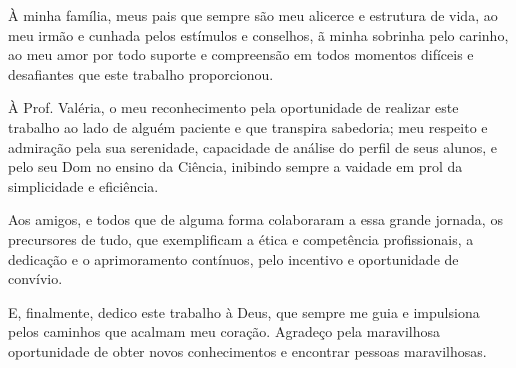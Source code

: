 À minha família, meus pais que sempre são meu alicerce e estrutura de vida, ao meu irmão e cunhada pelos estímulos e conselhos, ã minha sobrinha pelo carinho, ao meu amor por todo suporte e compreensão em todos momentos difíceis e desafiantes que este trabalho proporcionou.

À Prof. Valéria, o meu reconhecimento pela oportunidade de realizar este trabalho ao lado de alguém paciente e que transpira sabedoria; meu respeito e admiração pela sua serenidade, capacidade de análise do perfil de seus alunos, e pelo seu Dom no ensino da Ciência, inibindo sempre a vaidade em prol da simplicidade e eficiência.

Aos amigos, e todos que de alguma forma colaboraram a essa grande jornada, os precursores de tudo, que exemplificam a ética e competência profissionais, a dedicação e o aprimoramento contínuos, pelo incentivo e oportunidade de convívio.

E, finalmente, dedico este trabalho à Deus, que sempre me guia e impulsiona pelos caminhos que acalmam meu coração. Agradeço pela maravilhosa oportunidade de obter novos conhecimentos e encontrar pessoas maravilhosas.